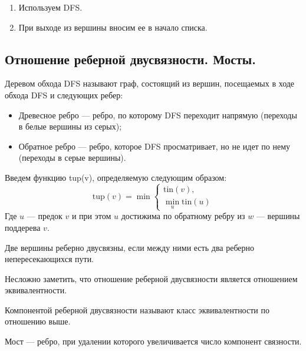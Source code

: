 \documentclass[a4paper,14pt]{article}
\begin{document}
    \begin{enumerate}
        \item Используем DFS.
        \item При выходе из вершины вносим ее в начало списка.
    \end{enumerate}
    
    \subsection{Отношение реберной двусвязности. Мосты.}
    \label{subsec:edge_biconnectivity}
    \begin{Def}
        Деревом обхода DFS называют граф, состоящий из вершин,
посещаемых в ходе обхода DFS и следующих ребер:
        \begin{itemize}
            \item Древесное ребро — ребро, по которому DFS переходит напрямую
            (переходы в белые вершины из серых);
            \item Обратное ребро — ребро, которое DFS просматривает, но не идет
            по нему (переходы в серые вершины).
        \end{itemize}
    \end{Def}
    Введем функцию tup(v), определяемую следующим образом:
    \[
    \text{tup}(v) = \min \left\{
    \begin{array}{l}
    \text{tin}(v), \\[6pt]
    \min\limits_{u} \text{tin}(u)
    \end{array}
    \right.
    \]
    Где $u$ — предок $v$ и при этом $u$ достижима по обратному ребру из $w$ — вершины поддерева $v$.

    \begin{Def}
        Две вершины реберно двусвязны, если между ними есть два реберно непересекающихся пути.
    \end{Def}
    \begin{prop}
        Несложно заметить, что отношение реберной двусвязности является отношением эквивалентности.
    \end{prop}
    \begin{Def}
        Компонентой реберной двусвязности называют класс эквивалентности по отношению выше.
    \end{Def}
    \begin{Def}
        Мост — ребро, при удалении которого увеличивается число компонент связности.
    \end{Def}
\end{document}
